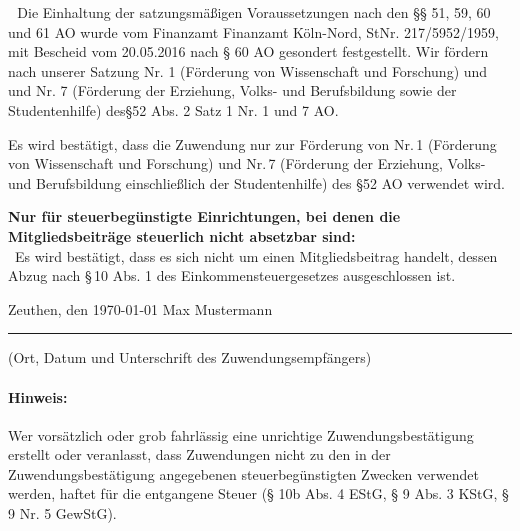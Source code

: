 \documentclass[11pt,ngerman]{scrartcl}
\newcommand{\mychecked}{\scalebox{1.5}{\XBox}~} %
\newcommand{\unmychecked}{\scalebox{1.5}{\Square}}
\begin{document}
\mychecked\,Die Einhaltung der satzungsmäßigen Voraussetzungen nach den §§ 51, 59, 60 und 61 AO wurde vom Finanzamt Finanzamt Köln-Nord, StNr. 217/5952/1959, mit Bescheid vom 20.05.2016 nach § 60 AO gesondert festgestellt. Wir fördern nach unserer Satzung Nr. 1 (Förderung von Wissenschaft und Forschung) und und Nr. 7 (Förderung der Erziehung, Volks- und Berufsbildung sowie der Studentenhilfe) des§52 Abs. 2 Satz 1 Nr. 1 und 7 AO.
 
\begin{mdframed}[style=MyFormStyle]%
\footnotesize Es wird bestätigt, dass die Zuwendung nur zur Förderung von Nr.\,1 (Förderung von Wissenschaft und Forschung) und  Nr.\,7 (Förderung der Erziehung, Volks- und Berufsbildung einschließlich der Studentenhilfe) des §52 AO verwendet wird. \vspace{0.5em}

\textbf{Nur für steuerbegünstigte Einrichtungen, bei denen die Mitgliedsbeiträge steuerlich nicht absetzbar sind:} \\
\unmychecked\, Es wird bestätigt, dass es sich nicht um einen Mitgliedsbeitrag handelt, dessen Abzug nach §\,10 Abs. 1 des Einkommensteuergesetzes ausgeschlossen ist. 

\end{mdframed} 


\vspace*{2.5em} 

Zeuthen, den \today \hspace*{20em} Max Mustermann

\hrule

\vspace*{0.5em} (Ort, Datum und Unterschrift des Zuwendungsempfängers) 

\paragraph{Hinweis:} Wer vorsätzlich oder grob fahrlässig eine unrichtige Zuwendungsbestätigung erstellt oder veranlasst, dass 
Zuwendungen nicht zu den in der Zuwendungsbestätigung angegebenen steuerbegünstigten Zwecken verwendet 
werden, haftet für die entgangene Steuer (§ 10b Abs. 4 EStG, § 9 Abs. 3 KStG, § 9 Nr. 5 GewStG). 
\end{document}
